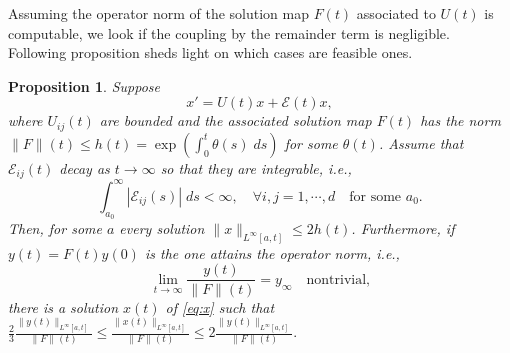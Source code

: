 \documentclass[a4paper,11pt]{article}
\newtheorem{proposition}{Proposition}[section]
\theoremstyle{remark}
\begin{document}
Assuming the operator norm of the solution map $F(t)$ associated to $U(t)$ is computable, we look if the coupling by the remainder term is negligible. Following proposition sheds light on which cases are feasible ones.
\begin{proposition} \label{prop:stab}
 Suppose
 \begin{equation}
x' = U(t)x + \mathcal{E}(t)x, \label{eq:x}
 \end{equation}
where $U_{ij}(t)$ are bounded and the associated solution map $F(t)$ has the norm $\|F\|(t) \le h(t)=\exp\left(\int_0^t \theta(s)\; ds\right)$ for some $\theta(t)$. Assume that $\mathcal{E}_{ij}(t)$ decay as $t \rightarrow \infty$ so that they are integrable, i.e.,
 $$ \int_{a_0}^\infty |\mathcal{E}_{ij}(s)| \; ds < \infty, \quad \forall i,j=1,\cdots,d \quad \text{for some $a_0$.}$$
 Then, for some $a$ every solution $\|x\|_{L^\infty[a,t]} \le 2h(t)$. Furthermore, if $y(t)=F(t)y(0)$ is the one attains the operator norm, i.e.,
 $$ \lim_{t \rightarrow \infty}\frac{y(t)}{\|F\|(t)} = y_\infty \quad \text{nontrivial,}$$
 there is a solution $x(t)$ of \eqref{eq:x} such that $\displaystyle \frac{2}{3}\frac{\|y(t)\|_{L^\infty[a,t]}}{\|F\|(t)}\le\frac{\|x(t)\|_{L^\infty[a,t]}}{\|F\|(t)} \le 2\frac{\|y(t)\|_{L^\infty[a,t]}}{\|F\|(t)}.$
\end{proposition}
\end{document}
